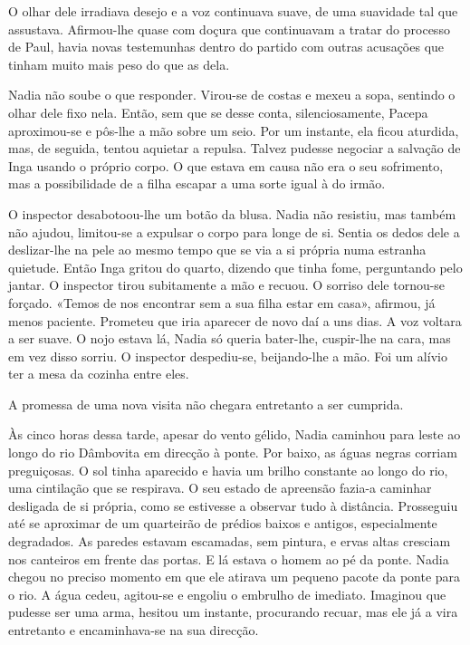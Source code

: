 O olhar dele irradiava desejo e a voz continuava suave, de uma suavidade
tal que assustava. Afirmou-lhe quase com doçura que continuavam a tratar
do processo de Paul, havia novas testemunhas dentro do partido com
outras acusações que tinham muito mais peso do que as dela.

Nadia não soube o que responder. Virou-se de costas e mexeu a sopa,
sentindo o olhar dele fixo nela. Então, sem que se desse conta,
silenciosamente, Pacepa aproximou-se e pôs-lhe a mão sobre um seio. Por
um instante, ela ficou
aturdida, mas, de seguida, tentou aquietar a repulsa. Talvez pudesse
negociar a salvação de Inga usando o próprio corpo. O que estava em
causa não era o seu sofrimento, mas a possibilidade de a filha escapar a
uma sorte igual à do irmão.

O inspector desabotoou-lhe um botão da blusa. Nadia não resistiu, mas
também não ajudou, limitou-se a expulsar o corpo para longe de si.
Sentia os dedos dele a deslizar-lhe na pele ao mesmo tempo que se via a si própria numa estranha
quietude. Então Inga gritou do quarto, dizendo que tinha fome,
perguntando pelo jantar. O inspector tirou subitamente a mão e recuou. O
sorriso dele tornou-se forçado. «Temos de nos encontrar sem a sua
filha estar em casa», afirmou, já menos paciente. Prometeu que iria
aparecer de novo daí a uns dias. A voz voltara a ser suave. O nojo
estava lá, Nadia só queria bater-lhe, cuspir-lhe na cara, mas em vez
disso sorriu. O inspector despediu-se, beijando-lhe a mão. Foi um alívio
ter a mesa da cozinha entre eles.

A promessa de uma nova visita não chegara entretanto a ser cumprida.

Às cinco horas dessa tarde, apesar do vento gélido, Nadia caminhou para
leste ao longo do rio Dâmbovita em direcção à ponte. Por baixo, as águas
negras corriam preguiçosas. O sol tinha aparecido e havia um brilho
constante ao longo do rio, uma cintilação que se respirava. O seu
estado de apreensão fazia-a caminhar desligada de si própria, como se
estivesse a observar tudo à distância. Prosseguiu até se aproximar de um
quarteirão de prédios
baixos e antigos, especialmente degradados. As paredes estavam
escamadas, sem pintura, e ervas altas cresciam nos canteiros em frente
das portas. E lá estava o homem ao pé da ponte. Nadia chegou no preciso
momento em que ele atirava um pequeno pacote da ponte para o rio. A água
cedeu, agitou-se e engoliu o embrulho de imediato. Imaginou que
pudesse ser uma arma, hesitou um instante, procurando recuar, mas ele
já a vira entretanto e encaminhava-se na sua direcção.

